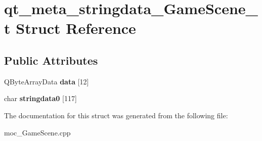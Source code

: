 \hypertarget{structqt__meta__stringdata__GameScene__t}{}\section{qt\+\_\+meta\+\_\+stringdata\+\_\+\+Game\+Scene\+\_\+t Struct Reference}
\label{structqt__meta__stringdata__GameScene__t}
\subsection*{Public Attributes}
\begin{DoxyCompactItemize}
\item 
Q\+Byte\+Array\+Data {\bfseries data} \mbox{[}12\mbox{]}\hypertarget{structqt__meta__stringdata__GameScene__t_a26503bb9519f5b841771365ea207a341}{}\label{structqt__meta__stringdata__GameScene__t_a26503bb9519f5b841771365ea207a341}

\item 
char {\bfseries stringdata0} \mbox{[}117\mbox{]}\hypertarget{structqt__meta__stringdata__GameScene__t_a922115ecfeb72b9395decb6d07c2a4fd}{}\label{structqt__meta__stringdata__GameScene__t_a922115ecfeb72b9395decb6d07c2a4fd}

\end{DoxyCompactItemize}


The documentation for this struct was generated from the following file\+:\begin{DoxyCompactItemize}
\item 
moc\+\_\+\+Game\+Scene.\+cpp\end{DoxyCompactItemize}
